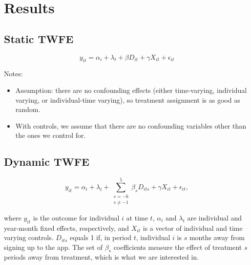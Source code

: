
\section{Results}%
\label{sec:results}

\subsection{Static TWFE}%
\label{sub:static_results}

\begin{equation}
    y_{it} = \alpha_i + \lambda_t + \beta D_{it} + \gamma X_{it} + \epsilon_{it}
\end{equation}

Notes:
\begin{itemize}
    \item Assumption: there are no confounding effects (either time-varying,
        individual varying, or individual-time varying), so treatment
        assignment is as good as random.

    \item With controls, we assume that there are no confounding variables
        other than the ones we control for.
\end{itemize}



\subsection{Dynamic TWFE}%
\label{sub:dynamic_results}

\begin{equation}
    y_{it} = \alpha_i + \lambda_t + \sum^{5}_{\substack{s=-6 \\
    s\neq-1}} \beta_s D_{its} + \gamma X_{it} + \epsilon_{it},
\end{equation}

where $y_{it}$ is the outcome for individual $i$ at time $t$, $\alpha_i$ and
$\lambda_t$ are individual and year-month fixed effects, respectively, and
$X_{it}$ is a vector of individual and time varying controls. $D_{its}$ equals
1 if, in period $t$, individual $i$ is $s$ months away from signing up to the
app. The set of $\beta_s$ coefficients measure the effect of treatment $s$
periods away from treatment, which is what we are interested in.

